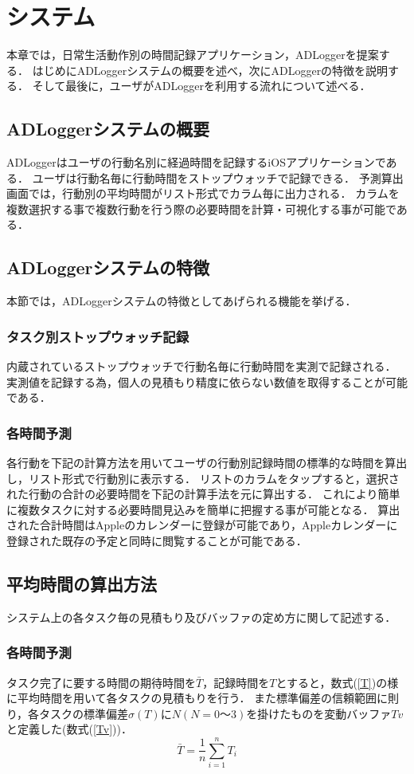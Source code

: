 \chapter{システム}
本章では，日常生活動作別の時間記録アプリケーション，ADLoggerを提案する．
はじめにADLoggerシステムの概要を述べ，次にADLoggerの特徴を説明する．
そして最後に，ユーザがADLoggerを利用する流れについて述べる．

\section{ADLoggerシステムの概要}
ADLoggerはユーザの行動名別に経過時間を記録するiOSアプリケーションである．
ユーザは行動名毎に行動時間をストップウォッチで記録できる．
予測算出画面では，行動別の平均時間がリスト形式でカラム毎に出力される．
カラムを複数選択する事で複数行動を行う際の必要時間を計算・可視化する事が可能である．

\section{ADLoggerシステムの特徴}
本節では，ADLoggerシステムの特徴としてあげられる機能を挙げる．

\subsection{タスク別ストップウォッチ記録}
内蔵されているストップウォッチで行動名毎に行動時間を実測で記録される．
実測値を記録する為，個人の見積もり精度に依らない数値を取得することが可能である．

\subsection{各時間予測}
各行動を下記の計算方法を用いてユーザの行動別記録時間の標準的な時間を算出し，リスト形式で行動別に表示する．
リストのカラムをタップすると，選択された行動の合計の必要時間を下記の計算手法を元に算出する．
これにより簡単に複数タスクに対する必要時間見込みを簡単に把握する事が可能となる．
算出された合計時間はAppleのカレンダーに登録が可能であり，Appleカレンダーに登録された既存の予定と同時に閲覧することが可能である．


\section{平均時間の算出方法}
システム上の各タスク毎の見積もり及びバッファの定め方に関して記述する．
\subsection{各時間予測}
タスク完了に要する時間の期待時間を$\bar{T}$，記録時間を$T$とすると，数式(\ref{T})の様に平均時間を用いて各タスクの見積もりを行う．
また標準偏差の信頼範囲に則り，各タスクの標準偏差$\sigma (T)$に$N (N=0〜3)$を掛けたものを変動バッファ$Tv$と定義した(数式(\ref{Tv}))．
\begin{equation}
\label{T}
\bar{T}=\frac{1}{n}\displaystyle\sum_{i=1}^{n}T_{i}
\end{equation}

